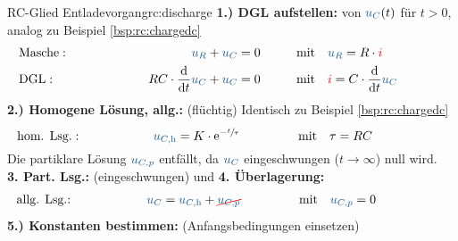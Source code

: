 {\begin{bsp}{RC-Glied Entladevorgang}{rc:discharge}
        \begingroup %
            \addtolength{\jot}{2pt} %
        \textbf{1.) DGL aufstellen:} von $\ecv{u_C}(t)$ für $t>0$, analog zu Beispiel \ref{bsp:rc:chargedc}
            \begin{align*}
            &\text{Masche}:&&&
                \ecv{u_R} + \ecv{u_C}  &= 0&&&
                &\text{mit}\quad \ecv{u_R} = R \cdot \eci{i} \\
            &\text{DGL}:&&&
                RC \cdot \frac{\mathrm{d}}{\mathrm{d}t} \ecv{u_C}  + \ecv{u_C}   &= 0 &&&
                &\text{mit}\quad \eci{i} = C \cdot \frac{\mathrm{d}}{\mathrm{d}t} \ecv{u_C}
            \\[-15pt]&\hphantom{R1ooooooo}&&&\hphantom{L3oooooooooooooooooooo}&\hphantom{R3ooo}&&&&\hphantom{R5oooooooooooooooooooooo}\nonumber%
        \end{align*}%
        \textbf{2.) Homogene Lösung, allg.:} (flüchtig) Identisch zu Beispiel \ref{bsp:rc:chargedc}%
        \begin{align*}%
            &\text{hom. Lsg.}:&&&
                \ecv{u_{C,\mathrm{h}}} = K \cdot \mathrm{e}^{-\sfrac{t}{\tau}}&&&&
                &\text{mit}\quad \tau = RC
            \\[-15pt]&\hphantom{R1ooooooo}&&&\hphantom{L3oooooooooooooooooooo}&\hphantom{R3ooo}&&&&\hphantom{R5oooooooooooooooooooooo}\nonumber%
        \end{align*}%
        Die partiklare Lösung $\ecv{u_{C,p}}$ entfällt, da $\ecv{u_C}$ eingeschwungen ($t \to \infty$) null wird.\\[6pt]%
        \textbf{3. Part. Lsg.:} (eingeschwungen) und \textbf{4. Überlagerung:}%
        \begin{align*}%
            &\text{allg. Lsg.:}&&&
                \ecv{u_C} &= \ecv{u_{C,\mathrm{h}}} + \redcancel{\ecv{u_{C,p}}}&&&
                &\text{mit}\quad \ecv{u_{C,p}}=0
            \\[-15pt]&\hphantom{R1oooooooooooo}&&&\hphantom{L3ooo}&\hphantom{R3oooooooooooooooo}&&&&\hphantom{R5oooooooooooooooooooooo}\nonumber%
        \end{align*}%
        \textbf{5.) Konstanten bestimmen:} (Anfangsbedingungen einsetzen)%
        \begin{align*}%

\end{align*}
\end{bsp}}
